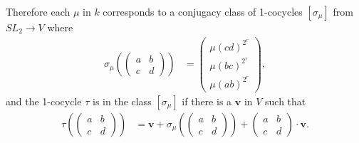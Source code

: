 		Therefore each $\mu$ in $k$ corresponds to a conjugacy class of 1-cocycles $[\sigma_\mu]$ from $SL_2\rightarrow V$ where
		\begin{align*}
		\sigma_\mu\left(\left(\begin{matrix}a & b \\ c & d \end{matrix}\right)\right) &=
		\left(\begin{matrix}  \mu(cd)^{2^r} \\ \mu(bc)^{2^r} \\ \mu(ab)^{2^r} \end{matrix}\right),
		\end{align*}
		and the 1-cocycle $\tau$ is in the class $[\sigma_\mu]$ if there is a $\mathbf{v}$ in $V$ such that
		\begin{align*}
		\tau\left(\left(\begin{matrix}a & b \\ c & d \end{matrix}\right)\right) &=
\mathbf{v} + \sigma_\mu\left(\left(\begin{matrix}a & b \\ c & d \end{matrix}\right)\right)
	+ \left(\begin{matrix}a & b \\ c & d \end{matrix}\right)\cdot\mathbf{v}.
	\end{align*}

